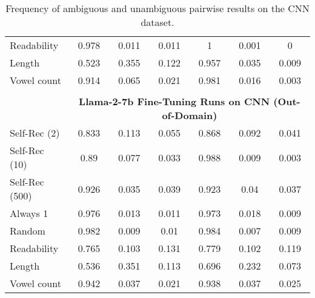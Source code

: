 \begin{table}[h]
\begin{tabular}{l|cccccc}
        Readability                        & 0.978       & 0.011     & 0.011        & 1           & 0.001     & 0           \\
        Length                             & 0.523       & 0.355     & 0.122        & 0.957       & 0.035     & 0.009       \\
        Vowel count                        & 0.914       & 0.065     & 0.021        & 0.981       & 0.016     & 0.003       \\
        \multicolumn{7}{c}{} \\
        \multicolumn{1}{c}{} & \multicolumn{6}{c}{\textbf{Llama-2-7b Fine-Tuning Runs on CNN (Out-of-Domain)}} \\
        Self-Rec (2)                       & 0.833       & 0.113     & 0.055        & 0.868       & 0.092     & 0.041       \\
        Self-Rec (10)                      & 0.89        & 0.077     & 0.033        & 0.988       & 0.009     & 0.003       \\
        Self-Rec (500)                     & 0.926       & 0.035     & 0.039        & 0.923       & 0.04      & 0.037       \\
        Always 1                           & 0.976       & 0.013     & 0.011        & 0.973       & 0.018     & 0.009       \\
        Random                             & 0.982       & 0.009     & 0.01         & 0.984       & 0.007     & 0.009       \\
        Readability                        & 0.765       & 0.103     & 0.131        & 0.779       & 0.102     & 0.119       \\
        Length                             & 0.536       & 0.351     & 0.113        & 0.696       & 0.232     & 0.073       \\
        Vowel count                        & 0.942       & 0.037     & 0.021        & 0.938       & 0.037     & 0.025       \\
    \end{tabular}
    \caption{Frequency of ambiguous and unambiguous pairwise results on the CNN dataset.}
    \label{table:ambiguous_cnn}
\end{table}